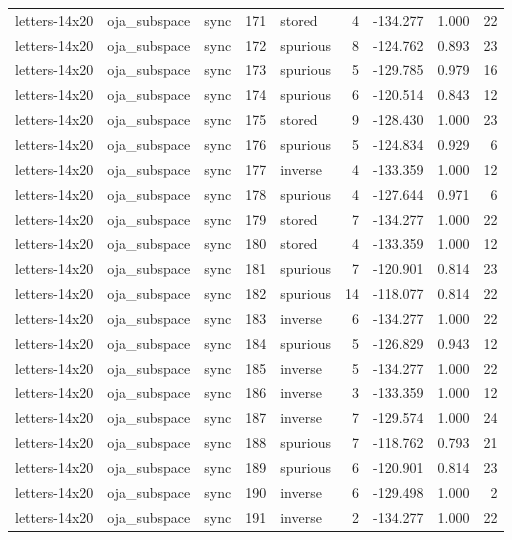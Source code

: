 \begin{tabular}{lllrlrrrr}
letters-14x20 & oja\_subspace & sync & 171 & stored & 4 & -134.277 & 1.000 & 22 \\
letters-14x20 & oja\_subspace & sync & 172 & spurious & 8 & -124.762 & 0.893 & 23 \\
letters-14x20 & oja\_subspace & sync & 173 & spurious & 5 & -129.785 & 0.979 & 16 \\
letters-14x20 & oja\_subspace & sync & 174 & spurious & 6 & -120.514 & 0.843 & 12 \\
letters-14x20 & oja\_subspace & sync & 175 & stored & 9 & -128.430 & 1.000 & 23 \\
letters-14x20 & oja\_subspace & sync & 176 & spurious & 5 & -124.834 & 0.929 & 6 \\
letters-14x20 & oja\_subspace & sync & 177 & inverse & 4 & -133.359 & 1.000 & 12 \\
letters-14x20 & oja\_subspace & sync & 178 & spurious & 4 & -127.644 & 0.971 & 6 \\
letters-14x20 & oja\_subspace & sync & 179 & stored & 7 & -134.277 & 1.000 & 22 \\
letters-14x20 & oja\_subspace & sync & 180 & stored & 4 & -133.359 & 1.000 & 12 \\
letters-14x20 & oja\_subspace & sync & 181 & spurious & 7 & -120.901 & 0.814 & 23 \\
letters-14x20 & oja\_subspace & sync & 182 & spurious & 14 & -118.077 & 0.814 & 22 \\
letters-14x20 & oja\_subspace & sync & 183 & inverse & 6 & -134.277 & 1.000 & 22 \\
letters-14x20 & oja\_subspace & sync & 184 & spurious & 5 & -126.829 & 0.943 & 12 \\
letters-14x20 & oja\_subspace & sync & 185 & inverse & 5 & -134.277 & 1.000 & 22 \\
letters-14x20 & oja\_subspace & sync & 186 & inverse & 3 & -133.359 & 1.000 & 12 \\
letters-14x20 & oja\_subspace & sync & 187 & inverse & 7 & -129.574 & 1.000 & 24 \\
letters-14x20 & oja\_subspace & sync & 188 & spurious & 7 & -118.762 & 0.793 & 21 \\
letters-14x20 & oja\_subspace & sync & 189 & spurious & 6 & -120.901 & 0.814 & 23 \\
letters-14x20 & oja\_subspace & sync & 190 & inverse & 6 & -129.498 & 1.000 & 2 \\
letters-14x20 & oja\_subspace & sync & 191 & inverse & 2 & -134.277 & 1.000 & 22 \\

\end{tabular}
